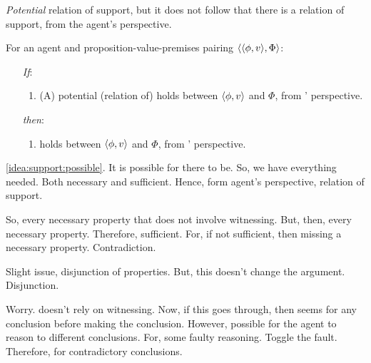 \begin{note}
  \emph{Potential} relation of support, but it does not follow that there is a relation of support, from the agent's perspective.
\end{note}

\begin{note}
  \begin{proposition}
    \label{prop:pot-support-onlyIf-support}
    For an agent \vAgent{} and proposition-value-premises pairing \(\langle \langle \phi, v \rangle, \Phi \rangle\):
    \begin{enumerate}
    \item[\emph{If}:]
      \begin{enumerate}[label=\alph*., ref=(\alph*.)]
      \item
        (A) potential (relation of) \support{} holds between \(\langle \phi, v \rangle\) and \(\Phi\), from \vAgent{}' perspective.
      \end{enumerate}
    \item[\emph{then}:]
      \begin{enumerate}[label=\alph*., ref=(\alph*.), resume]
      \item
         holds between \(\langle \phi, v \rangle\) and \(\Phi\), from \vAgent{}' perspective.
      \end{enumerate}
    \end{enumerate}
    \vspace{-\baselineskip}
  \end{proposition}

  \begin{argument}
    \autoref{idea:support:possible}.
    It is possible for there to be.
    So, we have everything needed.
    Both necessary and sufficient.
    Hence, form agent's perspective, relation of support.

    So, every necessary property that does not involve witnessing.
    But, then, every necessary property.
    Therefore, sufficient.
    For, if not sufficient, then missing a necessary property.
    Contradiction.

    Slight issue, disjunction of properties.
    But, this doesn't change the argument.
    Disjunction.
  \end{argument}
\end{note}

\begin{note}
  \color{red}
  Worry.
   doesn't rely on witnessing.
  Now, if this goes through, then seems \support{} for any conclusion before making the conclusion.
  However, possible for the agent to reason to different conclusions.
  For, some faulty reasoning.
  Toggle the fault.
  Therefore, \support{} for contradictory conclusions.
\end{note}

